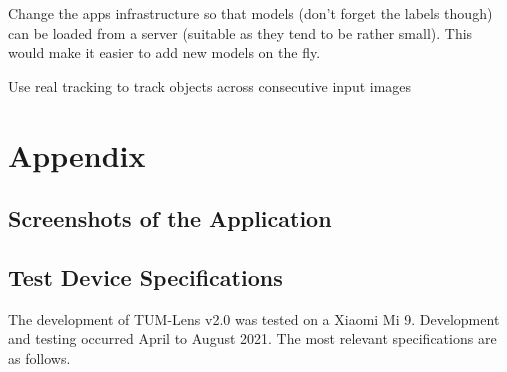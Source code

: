 \documentclass[
			   fontsize=11pt,
               paper=a4,
               bibliography=totoc,
               idxtotoc,
               headsepline,
               footsepline,
               footinclude=false,
               BCOR=12mm,
               DIV=13,
               openany,   %
               ]
               {scrbook}
\begin{document}
Change the apps infrastructure so that models (don't forget the labels though) can be loaded from a server (suitable as they tend to be rather small). This would make it easier to add new models on the fly.

Use real tracking to track objects across consecutive input images 





\appendix


\part{Appendix}


\chapter{Screenshots of the Application}


\chapter{Test Device Specifications} \label{chap:specs}

The development of TUM-Lens v2.0 was tested on a Xiaomi Mi 9. Development and testing occurred April to August 2021. The most relevant specifications are as follows. 
\end{document}
